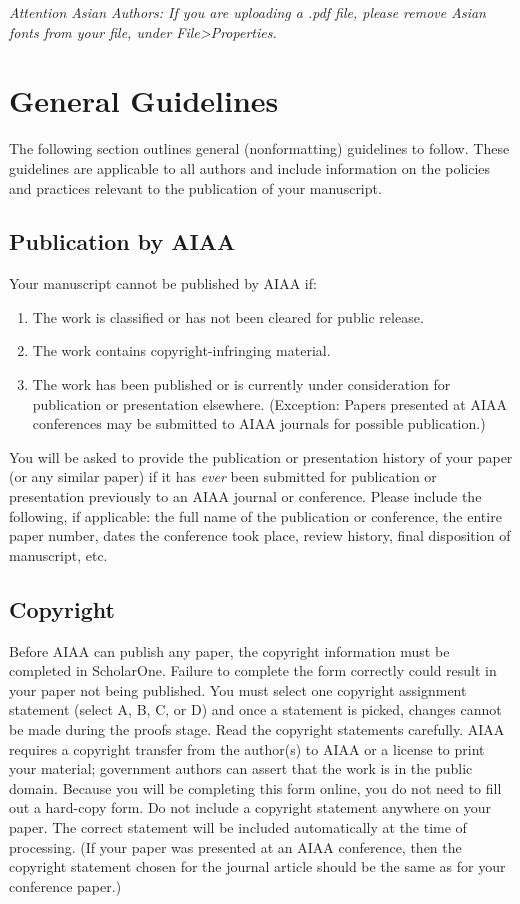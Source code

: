 \documentclass[journal ]{new-aiaa}
\begin{document}
\emph{Attention Asian Authors: If you are uploading a .pdf file, please remove Asian fonts from your file, under File>Properties.}

\section{General Guidelines}

The following section outlines general (nonformatting) guidelines to follow. These guidelines are applicable to all authors and include information on the policies and practices relevant to the publication of your manuscript.

\subsection{Publication by AIAA}
Your manuscript cannot be published by AIAA if:
\begin{enumerate}
\item The work is classified or has not been cleared for public release.
\item The work contains copyright-infringing material.
\item The work has been published or is currently under consideration for publication or presentation elsewhere. (Exception: Papers presented at AIAA conferences may be submitted to AIAA journals for possible publication.)
\end{enumerate}

You will be asked to provide the publication or presentation history of your paper (or any similar paper) if it has \emph{ever} been submitted for publication or presentation previously to an AIAA journal or conference. Please include the following, if applicable: the full name of the publication or conference, the entire paper number, dates the conference took place, review history, final disposition of manuscript, etc.


\subsection{Copyright}

Before AIAA can publish any paper, the copyright information must be completed in ScholarOne. Failure to complete the form correctly could result in your paper not being published. You must select one copyright assignment statement (select A, B, C, or D) and once a statement is picked, changes cannot be made during the proofs stage. Read the copyright statements carefully. AIAA requires a copyright transfer from the author(s) to AIAA or a license to print your material; government authors can assert that the work is in the public domain. Because you will be completing this form online, you do not need to fill out a hard-copy form. Do not include a copyright statement anywhere on your paper. The correct statement will be included automatically at the time of processing. (If your paper was presented at an AIAA conference, then the copyright statement chosen for the journal article should be the same as for your conference paper.)
\end{document}
